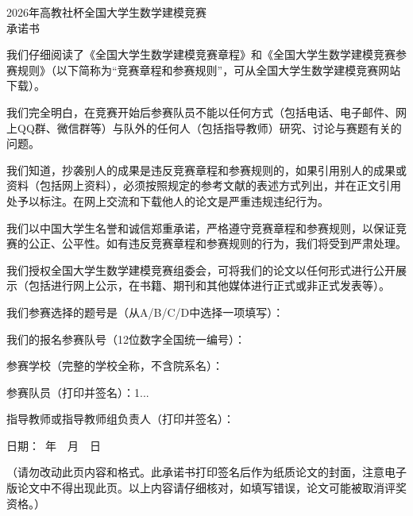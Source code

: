 \thispagestyle{empty}
\begin{center}
  {\heiti 2026年高教社杯全国大学生数学建模竞赛}\\[6pt]
  {\heiti 承\quad 诺\quad 书}
\end{center}

\vspace{1em}
我们仔细阅读了《全国大学生数学建模竞赛章程》和《全国大学生数学建模竞赛参赛规则》（以下简称为“竞赛章程和参赛规则”，可从全国大学生数学建模竞赛网站下载）。

我们完全明白，在竞赛开始后参赛队员不能以任何方式（包括电话、电子邮件、网上QQ群、微信群等）与队外的任何人（包括指导教师）研究、讨论与赛题有关的问题。

我们知道，抄袭别人的成果是违反竞赛章程和参赛规则的，如果引用别人的成果或资料（包括网上资料），必须按照规定的参考文献的表述方式列出，并在正文引用处予以标注。在网上交流和下载他人的论文是严重违规违纪行为。

我们以中国大学生名誉和诚信郑重承诺，严格遵守竞赛章程和参赛规则，以保证竞赛的公正、公平性。如有违反竞赛章程和参赛规则的行为，我们将受到严肃处理。

我们授权全国大学生数学建模竞赛组委会，可将我们的论文以任何形式进行公开展示（包括进行网上公示，在书籍、期刊和其他媒体进行正式或非正式发表等）。

\vspace{1em}
我们参赛选择的题号是（从A/B/C/D中选择一项填写）：\underline{\makebox[4em]{}}\par
我们的报名参赛队号（12位数字全国统一编号）：\underline{\makebox[12em]{}}\par
参赛学校（完整的学校全称，不含院系名）：\underline{\makebox[12em]{}}\par

\vspace{1.2em}
参赛队员（打印并签名）：1.\underline{\makebox[5.5em]{}}.\underline{\makebox[5.5em]{}}.\underline{\makebox[5.5em]{}}\par
\vspace{1.2em}
指导教师或指导教师组负责人（打印并签名）：\underline{\makebox[10em]{}}\par
\vspace{1.2em}
日期：\underline{\makebox[6em]{}}\ 年\ \underline{\makebox[2em]{}}\ 月\ \underline{\makebox[2em]{}}\ 日\par

\vspace{2em}
{
（请勿改动此页内容和格式。此承诺书打印签名后作为纸质论文的封面，注意电子版论文中不得出现此页。以上内容请仔细核对，如填写错误，论文可能被取消评奖资格。）}

\clearpage

